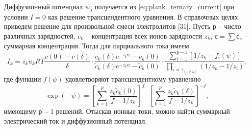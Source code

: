 Диффузионный потенциал \( \psi_d \) получается из
\eqref{eq:plank_ternary_current} при условии \( I = 0 \) как решение
трансцендентного уравнения. В справочных целях приведем решение для произвольной
смеси электролитов [31]. Пусть р -- число различных зарядностей,
\( \tilde{c}_k \) -- концентрация всех ионов зарядности \( z_k \),
\( с = \sum с_к \) -- суммарная концентрация. Тогда для парциального тока имеем
\begin{equation}
    I_k = z_ku_kRT\frac{c(0) - c(\delta)}{\delta}\cdot
    \frac{c_k(\delta)e^{-z_k\psi}-c_k(0)}
        {\tilde{c}_k(\delta)e^{-z_k\psi}-\tilde{c}_k(0)}\cdot
    \frac{\sum_{i=1}^{p-1}[1/z_k - f_i(\psi)]}
        {\prod_{i=1}_{(i \neq k)}(1/z_k - 1/z_i)},
\end{equation}
где функции \( f(\psi) \) удовлетворяют трансцендентному уравнению
\begin{equation}
    \exp(-\psi) = \left[\sum_{k=1}^p\frac{z_k\tilde{c}_k(0)}{f-1/z_k}\right]^f
    \cdot \left[\sum_{k=1}^p\frac{z_k\tilde{c}_k(\delta)}{f-1/z_k}\right]^{-f},
\end{equation}
имеющему \( р-1 \) решений. Отыскав ионные токи, можно найти суммарный
электрический ток и диффузионный потенциал.

